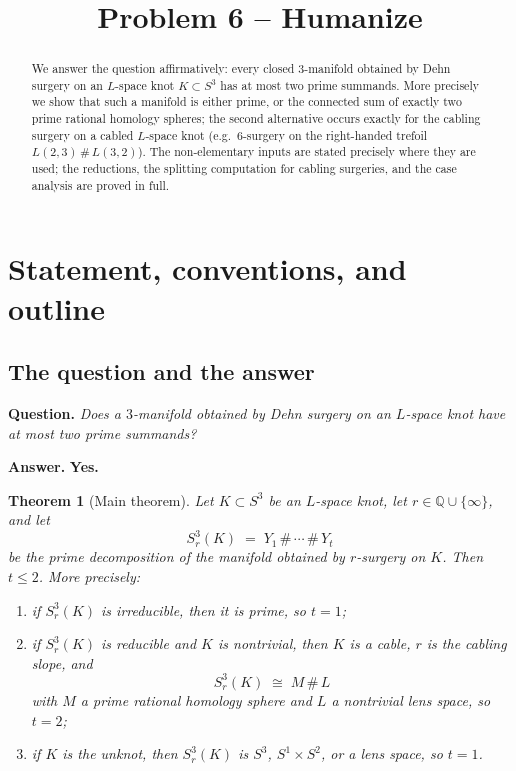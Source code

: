 \documentclass[11pt]{article}
\title{Problem 6 -- Humanize}
\author{}
\date{}
\newtheorem{theorem}{Theorem}[section]
\theoremstyle{definition}
\theoremstyle{remark}
\begin{document}
\maketitle

\begin{abstract}
\noindent We answer the question affirmatively: every closed $3$-manifold
obtained by Dehn surgery on an $L$-space knot $K\subset S^{3}$ has at most two
prime summands.  More precisely we show that such a manifold is either prime,
or the connected sum of exactly two prime rational homology spheres; the
second alternative occurs exactly for the cabling surgery on a cabled
$L$-space knot (e.g.\ $6$-surgery on the right-handed trefoil
$L(2,3)\,\#\,L(3,2)$).  The non-elementary inputs are stated precisely where
they are used; the reductions, the splitting computation for cabling
surgeries, and the case analysis are proved in full.
\end{abstract}

\section{Statement, conventions, and outline}

\subsection{The question and the answer}

\textbf{Question.} \emph{Does a $3$-manifold obtained by Dehn surgery on an
$L$-space knot have at most two prime summands?}

\medskip
\noindent\textbf{Answer.} \textbf{Yes.}

\begin{theorem}[Main theorem]\label{thm:main}
Let $K\subset S^{3}$ be an $L$-space knot, let $r\in\mathbb{Q}\cup\{\infty\}$,
and let
\[
S^{3}_{r}(K)\;=\;Y_{1}\,\#\,\cdots\,\#\,Y_{t}
\]
be the prime decomposition of the manifold obtained by $r$-surgery on $K$.
Then $t\le 2$.  More precisely:
\begin{enumerate}[label=\textup{(\roman*)},leftmargin=2.2em]
 \item if $S^{3}_{r}(K)$ is irreducible, then it is prime, so $t=1$;
 \item if $S^{3}_{r}(K)$ is reducible and $K$ is nontrivial, then $K$ is a
 cable, $r$ is the cabling slope, and
 \[
 S^{3}_{r}(K)\;\cong\;M\,\#\,L
 \]
 with $M$ a prime rational homology sphere and $L$ a nontrivial lens space, so
 $t=2$;
 \item if $K$ is the unknot, then $S^{3}_{r}(K)$ is $S^3$, $S^1\times S^2$, or
 a lens space, so $t=1$.
\end{enumerate}
\end{theorem}
\end{document}
